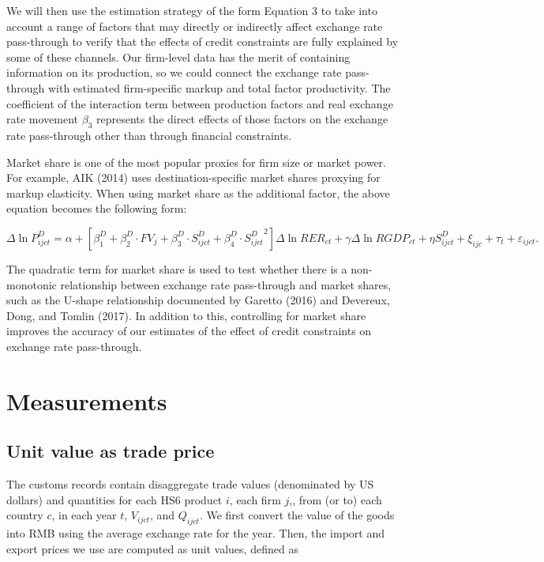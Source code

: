 We will then use the estimation strategy of the form Equation 3 to take into account a range of factors that may directly or indirectly affect exchange rate pass-through to verify that the effects of credit constraints are fully explained by some of these channels. Our firm-level data has the merit of containing information on its production, so we could connect the exchange rate pass-through with estimated firm-specific markup and total factor productivity. The coefficient of the interaction term between production factors and real exchange rate movement $\beta_3$ represents the direct effects of those factors on the exchange rate pass-through other than through financial constraints. 

Market share is one of the most popular proxies for firm size or market power. For example, AIK (2014)\cite{aik2014} uses destination-specific market shares proxying for markup elasticity. When using market share as the additional factor, the above equation becomes the following form:

\begin{equation}
	\Delta \ln P^{D}_{ijct}=\alpha+[\beta^D_{1}+ \beta^D_{2} \cdot FV_{j}+\beta^D_{3} \cdot S^{D}_{ijct}+\beta^D_4 \cdot {S^{D}_{ijct}}^2] \Delta \ln RER_{ct} +\gamma \Delta \ln RGDP_{ct}+ \eta S^{D}_{ijct}+\xi_{ijc}+\tau_{t} +\varepsilon_{ijct}.
	\label{eq4.4}
\end{equation}

The quadratic term for market share is used to test whether there is a non-monotonic relationship between exchange rate pass-through and market shares, such as the U-shape relationship documented by Garetto (2016)\cite{garetto2016} and Devereux, Dong, and Tomlin (2017)\cite{devereux2017}. In addition to this, controlling for market share improves the accuracy of our estimates of the effect of credit constraints on exchange rate pass-through.

\section{Measurements}

\subsection{Unit value as trade price}

The customs records contain disaggregate trade values (denominated by US dollars) and quantities for each HS6 product $i$, each firm $j$,, from (or to) each country $c$, in each year $t$, $V_{ijct}$, and $Q_{ijct}$. We first convert the value of the goods into RMB using the average exchange rate for the year. Then, the import and export prices we use are computed as unit values, defined as 

